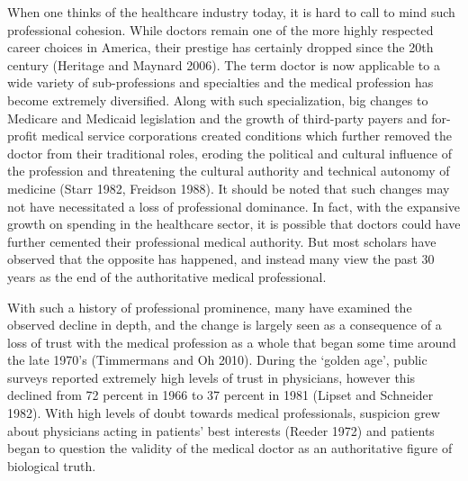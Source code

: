 \documentclass[12pt,twoside]{reedthesis}
\begin{document}
  When one thinks of the healthcare industry today, it is hard to call to
  mind such professional cohesion. While doctors remain one of the more
  highly respected career choices in America, their prestige has certainly
  dropped since the 20th century (Heritage and Maynard 2006). The term
  doctor is now applicable to a wide variety of sub-professions and
  specialties and the medical profession has become extremely diversified.
  Along with such specialization, big changes to Medicare and Medicaid
  legislation and the growth of third-party payers and for-profit medical
  service corporations created conditions which further removed the doctor
  from their traditional roles, eroding the political and cultural
  influence of the profession and threatening the cultural authority and
  technical autonomy of medicine (Starr 1982, Freidson 1988). It should be
  noted that such changes may not have necessitated a loss of professional
  dominance. In fact, with the expansive growth on spending in the
  healthcare sector, it is possible that doctors could have further
  cemented their professional medical authority. But most scholars have
  observed that the opposite has happened, and instead many view the past
  30 years as the end of the authoritative medical professional.
  
  With such a history of professional prominence, many have examined the
  observed decline in depth, and the change is largely seen as a
  consequence of a loss of trust with the medical profession as a whole
  that began some time around the late 1970's (Timmermans and Oh 2010).
  During the `golden age', public surveys reported extremely high levels
  of trust in physicians, however this declined from 72 percent in 1966 to
  37 percent in 1981 (Lipset and Schneider 1982). With high levels of
  doubt towards medical professionals, suspicion grew about physicians
  acting in patients' best interests (Reeder 1972) and patients began to
  question the validity of the medical doctor as an authoritative figure
  of biological truth.
  
\end{document}
